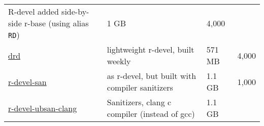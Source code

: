 \begin{longtable}[]{@{}llll@{}}
\begin{minipage}[t]{0.50\columnwidth}
R-devel added side-by-side r-base (using alias \texttt{RD})\strut
\end{minipage} & \begin{minipage}[t]{0.08\columnwidth}\raggedright\strut
1 GB\strut
\end{minipage} & \begin{minipage}[t]{0.10\columnwidth}\raggedright\strut
4,000\strut
\end{minipage}\tabularnewline
\begin{minipage}[t]{0.20\columnwidth}\raggedright\strut
\href{https://hub.docker.com/r/rocker/drd}{drd}\strut
\end{minipage} & \begin{minipage}[t]{0.50\columnwidth}\raggedright\strut
lightweight r-devel, built weekly\strut
\end{minipage} & \begin{minipage}[t]{0.08\columnwidth}\raggedright\strut
571 MB\strut
\end{minipage} & \begin{minipage}[t]{0.10\columnwidth}\raggedright\strut
4,000\strut
\end{minipage}\tabularnewline
\begin{minipage}[t]{0.20\columnwidth}\raggedright\strut
\href{https://hub.docker.com/r/rocker/r-devel-san}{r-devel-san}\strut
\end{minipage} & \begin{minipage}[t]{0.50\columnwidth}\raggedright\strut
as r-devel, but built with compiler sanitizers\strut
\end{minipage} & \begin{minipage}[t]{0.08\columnwidth}\raggedright\strut
1.1 GB\strut
\end{minipage} & \begin{minipage}[t]{0.10\columnwidth}\raggedright\strut
1,000\strut
\end{minipage}\tabularnewline
\begin{minipage}[t]{0.20\columnwidth}\raggedright\strut
\href{https://hub.docker.com/r/rocker/r-devel-ubsan-clang}{r-devel-ubsan-clang}\strut
\end{minipage} & \begin{minipage}[t]{0.50\columnwidth}\raggedright\strut
Sanitizers, clang c compiler (instead of gcc)\strut
\end{minipage} & \begin{minipage}[t]{0.08\columnwidth}\raggedright\strut
1.1 GB\strut
\end{minipage} & \begin{minipage}[t]{0.10\columnwidth}\raggedright\strut

\end{minipage}
\end{longtable}
